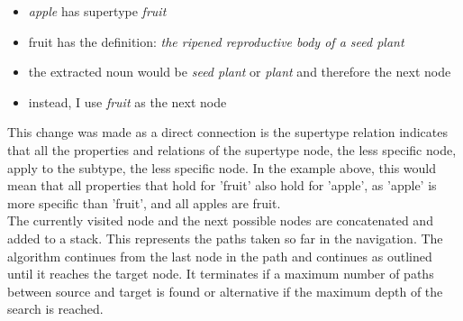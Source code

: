 \begin{itemize}
    \item \textit{apple} has supertype \textit{fruit}
    \item fruit has the definition: \textit{the ripened reproductive body of a seed plant}
    \item the extracted noun would be \textit{seed plant} or \textit{plant} and therefore the next node
    \item instead, I use \textit{fruit} as the next node
\end{itemize}
This change was made as a direct connection is the supertype relation indicates that all the properties and relations of the supertype node, the less specific node, apply to the subtype, the less specific node. In the example above, this would mean that all properties that hold for 'fruit' also hold for 'apple', as 'apple' is more specific than 'fruit', and all apples are fruit.\\
The currently visited node and the next possible nodes are concatenated and added to a stack. This represents the paths taken so far in the navigation. The algorithm continues from the last node in the path and continues as outlined until it reaches the target node. It terminates if a maximum number of paths between source and target is found or alternative if the maximum depth of the search is reached.
